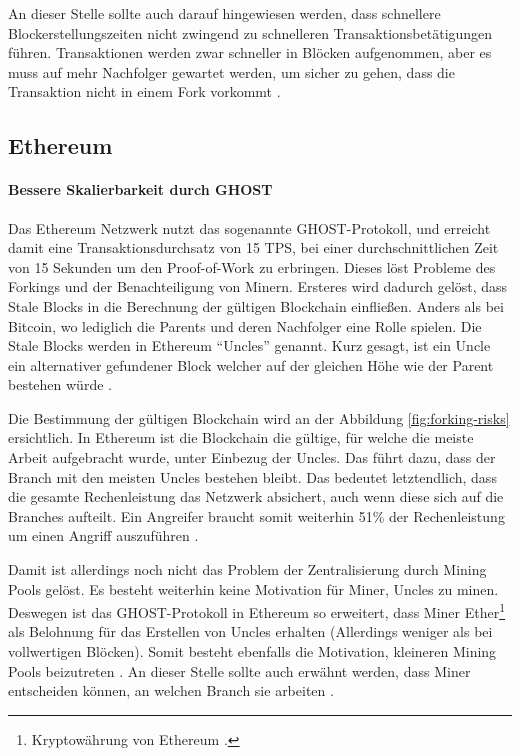 An dieser Stelle sollte auch darauf hingewiesen werden, dass schnellere Blockerstellungszeiten nicht zwingend zu schnelleren Transaktionsbetätigungen führen. Transaktionen werden zwar schneller in Blöcken aufgenommen, aber es muss auf mehr Nachfolger gewartet werden, um sicher zu gehen, dass die Transaktion nicht in einem Fork vorkommt \cite{SchererPerformanceScalabilityBlockchain2017}.

\subsection{Ethereum}

\paragraph{Bessere Skalierbarkeit durch GHOST}
Das Ethereum Netzwerk nutzt das sogenannte GHOST-Protokoll, und erreicht damit eine Transaktionsdurchsatz von 15 TPS, bei einer durchschnittlichen Zeit von 15 Sekunden um den Proof-of-Work zu erbringen. Dieses löst Probleme des Forkings und der Benachteiligung von Minern. Ersteres wird dadurch gelöst, dass Stale Blocks in die Berechnung der gültigen Blockchain einfließen. Anders als bei Bitcoin, wo lediglich die Parents und deren Nachfolger eine Rolle spielen. Die Stale Blocks werden in Ethereum ``Uncles'' genannt. Kurz gesagt, ist ein Uncle ein alternativer gefundener Block welcher auf der gleichen Höhe wie der Parent bestehen würde \cite{EthereumWhitepaper2017}.

Die Bestimmung der gültigen Blockchain wird an der Abbildung \ref{fig:forking-risks} ersichtlich. In Ethereum ist die Blockchain die gültige, für welche die meiste Arbeit aufgebracht wurde, unter Einbezug der Uncles. Das führt dazu, dass der Branch mit den meisten Uncles bestehen bleibt. Das bedeutet letztendlich, dass die gesamte Rechenleistung das Netzwerk absichert, auch wenn diese sich auf die Branches aufteilt. Ein Angreifer braucht somit weiterhin 51\% der Rechenleistung um einen Angriff auszuführen \cite{SompolinskyAcceleratingBitcoinTransaction2013}.

Damit ist allerdings noch nicht das Problem der Zentralisierung durch Mining Pools gelöst. Es besteht weiterhin keine Motivation für Miner, Uncles zu minen. Deswegen ist das GHOST-Protokoll in Ethereum so erweitert, dass Miner Ether\footnote{Kryptowährung von Ethereum \cite{EthereumWhitepaper2017}.} als Belohnung für das Erstellen von Uncles erhalten (Allerdings weniger als bei vollwertigen Blöcken). Somit besteht ebenfalls die Motivation, kleineren Mining Pools beizutreten \cite{EthereumWhitepaper2017}. An dieser Stelle sollte auch erwähnt werden, dass Miner entscheiden können, an welchen Branch sie arbeiten \cite{ZhengBlockchainChallengesOpportunities2017}.

